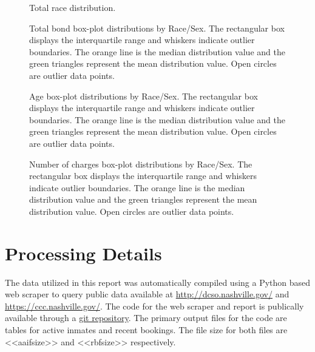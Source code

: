 \documentclass{article}
\begin{document}
\begin{figure}[H]
\centering
\noindent{}
\caption{Total race distribution.}
\label{fig:WRace_distr}
\end{figure}

\begin{figure}[H]
\centering
\noindent{}
\caption{Total bond box-plot distributions by Race/Sex. The rectangular box displays the interquartile range and whiskers indicate outlier boundaries. The orange line is the median distribution value and the green triangles represent the mean distribution value. Open circles are outlier data points.}
\label{fig:Tbond_BoxP}
\end{figure}

\begin{figure}[H]
\centering
\noindent{}
\caption{Age box-plot distributions by Race/Sex. The rectangular box displays the interquartile range and whiskers indicate outlier boundaries. The orange line is the median distribution value and the green triangles represent the mean distribution value. Open circles are outlier data points.}
\label{fig:Age_BoxP}
\end{figure}

\begin{figure}[H]
\centering
\noindent{}
\caption{Number of charges box-plot distributions by Race/Sex. The rectangular box displays the interquartile range and whiskers indicate outlier boundaries. The orange line is the median distribution value and the green triangles represent the mean distribution value. Open circles are outlier data points.}
\label{fig:Ncharges_BoxP}
\end{figure}


\section{Processing Details}
The data utilized in this report was automatically compiled using a Python based web scraper to query public data available at \url{http://dcso.nashville.gov/} and \url{https://ccc.nashville.gov/}. The code for the web scraper and report is publically available through a \href{https://github.com/dmdixon/bail}{git repository}. The primary output files for the code are tables for active inmates and recent bookings. The file size for both files are <<aaifsize>> and <<rbfsize>> respectively.
\end{document}
